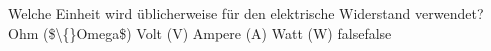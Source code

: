     {Welche Einheit wird üblicherweise für den elektrische Widerstand verwendet?}
    {Ohm (\$\textbackslash\{\}Omega\$)}
    {Volt (V)}
    {Ampere (A)}
    {Watt (W)}
    {false}{false}